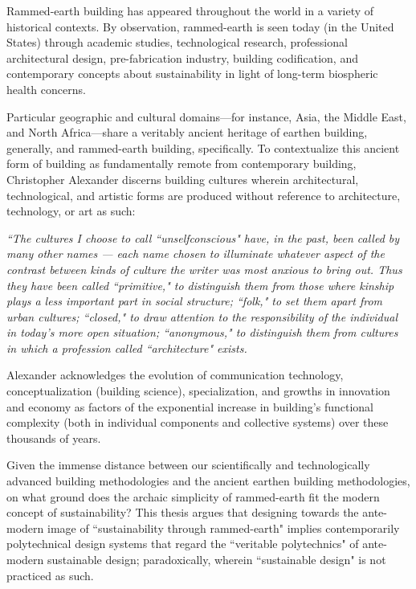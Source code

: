 Rammed-earth building has appeared throughout the world in a variety of historical contexts. By observation, rammed-earth is seen today (in the United States) through academic studies, technological research, professional architectural design, pre-fabrication industry, building codification, and contemporary concepts about sustainability in light of long-term biospheric health concerns.

Particular geographic and cultural domains---for instance, Asia, the Middle East, and North Africa---share a veritably ancient heritage of earthen building, generally, and rammed-earth building, specifically. \cite{RAMMEDEARTHHOUSE} To contextualize this ancient form of building as fundamentally remote from contemporary building, Christopher Alexander discerns building cultures wherein architectural, technological, and artistic forms are produced without reference to architecture, technology, or art as such:

\begin{flushright}
\small{
\textit{
``The cultures I choose to call ``unselfconscious" have, in the past, been called by many other names --- each name chosen to illuminate whatever aspect of the contrast between kinds of culture the writer was most anxious to bring out. Thus they have been called ``primitive," to distinguish them from those where kinship plays a less important part in social structure; ``folk," to set them apart from urban cultures; ``closed," to draw attention to the responsibility of the individual in today's more open situation; ``anonymous," to distinguish them from cultures in which a profession called ``architecture" exists.}} \cite[p33]{SYNOFFORM}
\end{flushright}

Alexander acknowledges the evolution of communication technology, conceptualization (building science), specialization, and growths in innovation and economy \cite[p33,34]{SYNOFFORM} as factors of the exponential increase in building's functional complexity (both in individual components and collective systems) over these thousands of years.

Given the immense distance between our scientifically and technologically advanced building methodologies and the ancient earthen building methodologies, on what ground does the archaic simplicity of rammed-earth fit the modern concept of sustainability? This thesis argues that designing towards the ante-modern image of ``sustainability through rammed-earth" implies contemporarily polytechnical design systems that regard the ``veritable polytechnics" of ante-modern sustainable design; paradoxically, wherein ``sustainable design" is not practiced as such.

